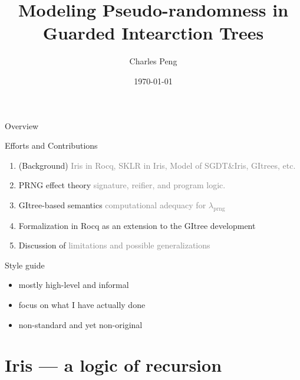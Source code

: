 \documentclass[8pt]{beamer}
\title{Modeling Pseudo-randomness in Guarded Intearction Trees}
\author{Charles Peng}
\date{\today}
\newcommand{\prng}{\mathrm{prng}}
\newcommand{\demph}[1]{\textcolor{gray}{#1}}
\begin{document}
  \maketitle{}

  \begin{frame}{Overview}

    \begin{block}{Efforts and Contributions}
      \begin{enumerate}
        \item (Background) \demph{Iris in Rocq, SKLR in Iris, Model of SGDT\&Iris, GItrees, etc.}
        \item PRNG effect theory \demph{signature, reifier, and program logic.}
        \item GItree-based semantics \demph{computational adequacy for \(\lambda_\prng\)}
        \item Formalization in Rocq as an extension to the GItree development
        \item Discussion of \demph{limitations and possible generalizations}
      \end{enumerate}
    \end{block}

    \pause

    \begin{block}{Style guide}
      \begin{itemize}
        \item mostly high-level and informal
        \item focus on what I have actually done
        \item non-standard and yet non-original
      \end{itemize}
    \end{block}
  \end{frame}

  \section{Iris --- a logic of recursion}
\end{document}
